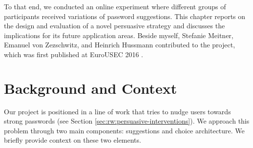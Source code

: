 To that end, we conducted an online experiment where different groups of participants received variations of password suggestions. This chapter reports on the design and evaluation of a novel persuasive strategy and discusses the implications for its future application areas. Beside myself, Stefanie Meitner, Emanuel von Zezschwitz, and Heinrich Hussmann contributed to the project, which was first published at EuroUSEC 2016 \cite{Seitz2016SuggestionsDecoy}.



\section{Background and Context}
Our project is positioned in a line of work that tries to nudge users towards strong passwords (see Section \ref{sec:rw:persuasive-interventions}). We approach this problem through two main components: suggestions and choice architecture. We briefly provide context on these two elements.  


